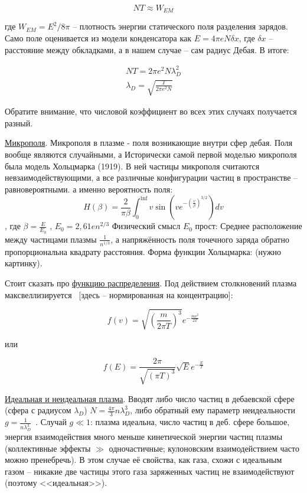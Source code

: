 \documentclass[10pt, a4paper]{article}
\begin{document}
\begin{itemize}
	\begin{equation*}
		NT \approx W_{EM}
	\end{equation*}

	где $W_{EM}=E^2/8\pi$ -- плотность энергии статического поля разделения зарядов. Само поле оценивается из модели конденсатора как $E=4\pi e N \delta x$, где $\delta x$ -- расстояние между обкладками, а в нашем случае -- сам радиус Дебая. В итоге:
	
	\begin{align*}
		NT = 2\pi e^2 N \lambda_D^2 \\
		\lambda_D = \sqrt{\frac{T}{2\pi e^2 N}}		
	\end{align*}

	Обратите внимание, что числовой коэффициент во всех этих случаях получается разный.
\end{itemize}

\uline{Микрополя}.
Микрополя в плазме - поля возникающие внутри сфер дебая. Поля вообще являются случайными, а Исторически самой первой моделью микрополя была модель Хольцмарка (1919). В ней частицы микрополя считаются невзаимодействующими, а все различные конфигурации частиц в пространстве – равновероятными.
а именно вероятность поля:
\begin{equation}
	H( \beta ) = \frac{2}{\pi \beta} \int_{0}^{\inf} v \sin(v e^{- (\frac{v}{\beta})^{3/2}}) dv
\end{equation}
, где $\beta = \frac{E}{E_0}$ , $E_0 = 2,61 e n^{2/3}$ 
Физический смысл $E_0$ прост: Среднее расположение между частицами плазмы $\frac{1}{n^{1/3}} $, а напряжённость поля точечного заряда обратно пропорциональна квадрату расстояния. Форма функции Хольцмарка:
(нужно картинку).

Стоит сказать про \uline{функцию распределения}. Под действием столкновений плазма максвеллизируется~\cite{kroll} [здесь -- нормированная на концентрацию]:

\begin{equation}
	f(v) = \sqrt{\left( \frac{m}{2\pi T}\right)^3} e^{-\frac{mv^2}{2T}}
\end{equation}

или

\begin{equation}
	f(E) = \frac{2\pi}{\sqrt{\left(\pi T\right)^3}}\sqrt{E} e^{-\frac{E}{T}}
\end{equation}

\uline{Идеальная и неидеальная плазма}. Вводят либо число частиц в дебаевской сфере (сфера с радиусом $\lambda_D$) $N = \frac{4\pi}{3}n\lambda_D^3$, либо обратный ему параметр неидеальности $g = \frac{1}{n\lambda_D^3}$~\cite{kroll}. Случай $g \ll 1$: плазма идеальна, число частиц в деб. сфере большое, энергия взаимодействия много меньше кинетической энергии частиц плазмы (коллективные эффекты $\gg$ одночастичные; кулоновским взаимодействием часто можно пренебречь). В этом случае её свойства, как газа, схожи с идеальным газом -- никакие две частицы этого газа заряженных частиц не взаимодействуют (поэтому <<идеальная>>).
\end{document}
